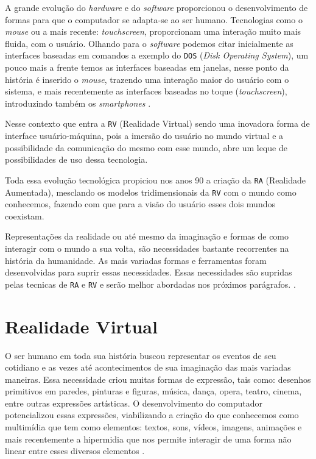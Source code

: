 A grande evolução do \textit{hardware} e do \textit{software} proporcionou o desenvolvimento de formas para
que o computador se adapta-se ao ser humano. Tecnologias como o \textit{mouse} ou a mais recente:
\textit{touchscreen}, proporcionam uma interação muito mais fluida, com o usuário. Olhando para o
\textit{software} podemos citar inicialmente as interfaces baseadas em comandos a exemplo do \verb'DOS'
(\textit{Disk Operating System}), um pouco mais a frente temos as interfaces baseadas em janelas, nesse ponto
da história é inserido o \textit{mouse}, trazendo uma interação maior do usuário com o sistema, e mais
recentemente as interfaces baseadas no toque (\textit{touchscreen}), introduzindo também os
\textit{smartphones} \cite{kirner2007}.

Nesse contexto que entra a \verb'RV' (Realidade Virtual) sendo uma inovadora forma de interface
usuário-máquina, pois a imersão do usuário no mundo virtual e a possibilidade da comunicação do mesmo com esse
mundo, abre um leque de possibilidades de uso dessa tecnologia.

Toda essa evolução tecnológica propiciou nos anos 90 a criação da \verb'RA' (Realidade Aumentada), mesclando
os modelos tridimensionais da \verb'RV' com o mundo como conhecemos, fazendo com que para a visão do usuário
esses dois mundos coexistam.

Representações da realidade ou até mesmo da imaginação e formas de como interagir com o mundo a sua volta, são
necessidades bastante recorrentes na história da humanidade. As mais variadas formas e ferramentas foram
desenvolvidas para suprir essas necessidades. Essas necessidades são supridas pelas tecnicas de \verb'RA' e
\verb'RV' e serão melhor abordadas nos próximos parágrafos. \cite{kirner2007,kirner2006}.

\section {Realidade Virtual}
O ser humano em toda sua história buscou representar os eventos de seu cotidiano e as vezes até acontecimentos
de sua imaginação das mais variadas maneiras. Essa necessidade criou muitas formas de expressão, tais como:
desenhos primitivos em paredes, pinturas e figuras, música, dança, opera, teatro, cinema, entre outras
expressões artísticas. O desenvolvimento do computador potencializou essas expressões, viabilizando a criação
do que conhecemos como multimídia que tem como elementos: textos, sons, vídeos, imagens, animações e mais
recentemente a hipermidia que nos permite interagir de uma forma não linear entre esses diversos
elementos \cite{kirner2006}.

